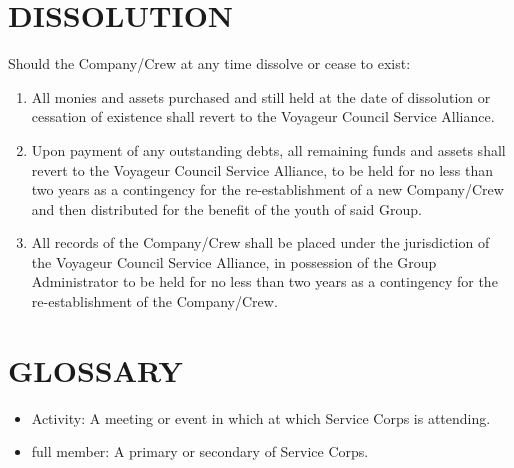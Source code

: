 \documentclass{Service_Corps_Document}
\begin{document}
\section{DISSOLUTION}
Should the Company/Crew at any time dissolve or cease to exist: 
\begin{enumerate}
	\item All monies and assets purchased and still held at the date of dissolution or cessation of existence shall revert to the Voyageur Council Service Alliance.
	\item Upon payment of any outstanding debts, all remaining funds and assets shall revert to the Voyageur Council Service Alliance, to be held for no less than two years as a contingency for the re-establishment of a new Company/Crew and then distributed for the benefit of the youth of said Group.
	\item All records of the Company/Crew shall be placed under the jurisdiction of the Voyageur Council Service Alliance, in possession of the Group Administrator to be held for no less than two years as a contingency for the re-establishment of the Company/Crew. 
\end{enumerate}
\section{GLOSSARY}
\begin{itemize}
	\item Activity: A meeting or event in which at which Service Corps is attending.
	\item full member: A primary or secondary of  Service Corps.
\end{itemize}
\end{document}
